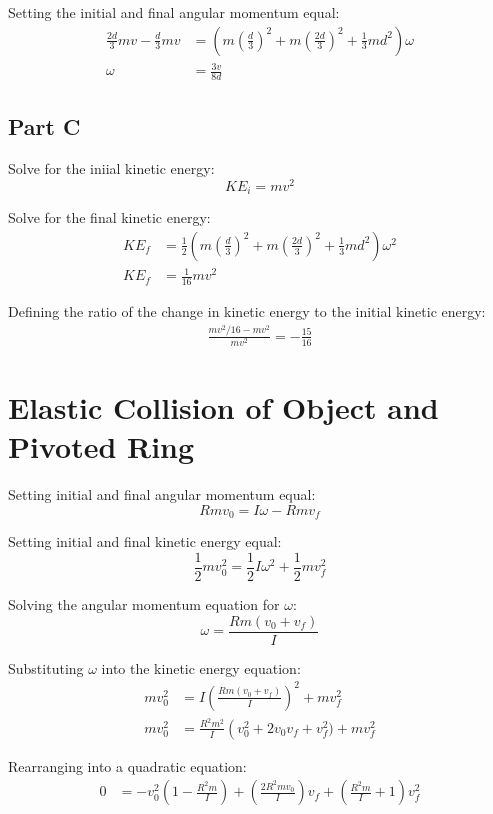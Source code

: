 \documentclass{article}
\begin{document}
Setting the initial and final angular momentum equal:
\begin{align*}
    \frac{2 d}{3} m v - \frac{d}{3} m v &= \left( m \left( \frac{d}{3} \right)^2
    + m \left( \frac{2 d}{3} \right)^2 + \frac{1}{3} m d^2 \right) \omega \\
    \omega &= \frac{3 v}{8 d}
\end{align*}

\subsection*{Part C}

Solve for the iniial kinetic energy:
$$KE_i = m v^2$$

Solve for the final kinetic energy:
\begin{align*}
    KE_f &= \frac{1}{2} \left( m \left( \frac{d}{3} \right)^2 + m \left( \frac{2 d}{3}
    \right)^2 + \frac{1}{3} m d^2 \right) \omega^2 \\
    KE_f &= \frac{1}{16} m v^2
\end{align*}

Defining the ratio of the change in kinetic energy to the initial kinetic
energy:
\begin{align*}
    \frac{ m v^2/16 - m v^2}{m v^2} = -\frac{15}{16}
\end{align*}

\section{Elastic Collision of Object and Pivoted Ring}

Setting initial and final angular momentum equal:
$$R m v_0 = I \omega - R m v_f$$

Setting initial and final kinetic energy equal:
$$\frac{1}{2} m v_0^2 = \frac{1}{2} I \omega^2 + \frac{1}{2} m v_f^2$$

Solving the angular momentum equation for $\omega$:
$$\omega = \frac{R m (v_0 + v_f)}{I}$$

Substituting $\omega$ into the kinetic energy equation:
\begin{align*}
    m v_0^2 &= I \left( \frac{R m (v_0 + v_f)}{I} \right)^2 + m v_f^2 \\
    m v_0^2 &= \frac{ R^2 m^2 }{I} \left( v_0^2 + 2 v_0 v_f + v_f^2) + m v_f^2
\end{align*}

Rearranging into a quadratic equation:
\begin{align*}
    0 &= -v_0^2 \left( 1 - \frac{R^2 m}{I} \right) + \left( \frac{2 R^2 m
    v_0}{I} \right) v_f + \left( \frac{R^2 m}{I} + 1 \right) v_f^2
\end{align*}
\end{document}

